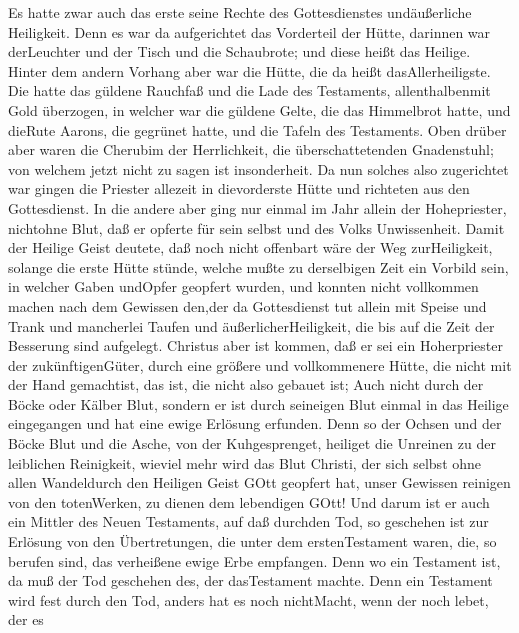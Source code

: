  Es hatte zwar auch das erste seine Rechte des
Gottesdienstes undäußerliche Heiligkeit.  Denn es war da
aufgerichtet das Vorderteil der Hütte, darinnen war derLeuchter und der
Tisch und die Schaubrote; und diese heißt das Heilige. 
Hinter dem andern Vorhang aber war die Hütte, die da heißt
dasAllerheiligste.  Die hatte das güldene Rauchfaß und die
Lade des Testaments, allenthalbenmit Gold überzogen, in welcher war die
güldene Gelte, die das Himmelbrot hatte, und dieRute Aarons, die
gegrünet hatte, und die Tafeln des Testaments.  Oben drüber
aber waren die Cherubim der Herrlichkeit, die überschattetenden
Gnadenstuhl; von welchem jetzt nicht zu sagen ist insonderheit.
 Da nun solches also zugerichtet war gingen die Priester
allezeit in dievorderste Hütte und richteten aus den Gottesdienst.
 In die andere aber ging nur einmal im Jahr allein der
Hohepriester, nichtohne Blut, daß er opferte für sein selbst und des
Volks Unwissenheit.  Damit der Heilige Geist deutete, daß
noch nicht offenbart wäre der Weg zurHeiligkeit, solange die erste Hütte
stünde,  welche mußte zu derselbigen Zeit ein Vorbild sein,
in welcher Gaben undOpfer geopfert wurden, und konnten nicht vollkommen
machen nach dem Gewissen den,der da Gottesdienst tut 
allein mit Speise und Trank und mancherlei Taufen und
äußerlicherHeiligkeit, die bis auf die Zeit der Besserung sind
aufgelegt.  Christus aber ist kommen, daß er sei ein
Hoherpriester der zukünftigenGüter, durch eine größere und vollkommenere
Hütte, die nicht mit der Hand gemachtist, das ist, die nicht also
gebauet ist;  Auch nicht durch der Böcke oder Kälber Blut,
sondern er ist durch seineigen Blut einmal in das Heilige eingegangen
und hat eine ewige Erlösung erfunden.  Denn so der Ochsen
und der Böcke Blut und die Asche, von der Kuhgesprenget, heiliget die
Unreinen zu der leiblichen Reinigkeit,  wieviel mehr wird
das Blut Christi, der sich selbst ohne allen Wandeldurch den Heiligen
Geist GOtt geopfert hat, unser Gewissen reinigen von den totenWerken, zu
dienen dem lebendigen GOtt!  Und darum ist er auch ein
Mittler des Neuen Testaments, auf daß durchden Tod, so geschehen ist zur
Erlösung von den Übertretungen, die unter dem erstenTestament waren,
die, so berufen sind, das verheißene ewige Erbe empfangen. 
Denn wo ein Testament ist, da muß der Tod geschehen des, der
dasTestament machte.  Denn ein Testament wird fest durch
den Tod, anders hat es noch nichtMacht, wenn der noch lebet, der es

